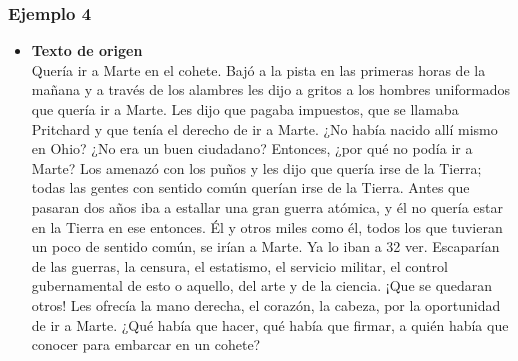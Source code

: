     \subsubsection{Ejemplo 4}
        \begin{itemize}
            \item \textbf{Texto de origen} \\
            Quería ir a Marte en el cohete. Bajó a la pista en las primeras horas de la mañana
y a través de los alambres les dijo a gritos a los hombres uniformados que quería
ir a Marte. Les dijo que pagaba impuestos, que se llamaba Pritchard y que tenía el
derecho de ir a Marte. ¿No había nacido allí mismo en Ohio? ¿No era un buen
ciudadano? Entonces, ¿por qué no podía ir a Marte? Los amenazó con los puños
y les dijo que quería irse de la Tierra; todas las gentes con sentido común querían
irse de la Tierra. Antes que pasaran dos años iba a estallar una gran guerra
atómica, y él no quería estar en la Tierra en ese entonces. Él y otros miles como
él, todos los que tuvieran un poco de sentido común, se irían a Marte. Ya lo iban a 
32
ver. Escaparían de las guerras, la censura, el estatismo, el servicio militar, el
control gubernamental de esto o aquello, del arte y de la ciencia. ¡Que se
quedaran otros! Les ofrecía la mano derecha, el corazón, la cabeza, por la
oportunidad de ir a Marte. ¿Qué había que hacer, qué había que firmar, a quién
había que conocer para embarcar en un cohete?


\end{itemize}
